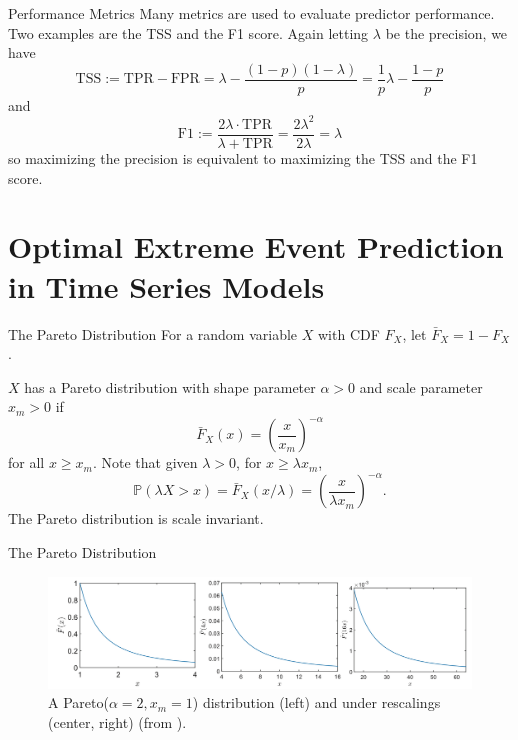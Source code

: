\documentclass{beamer}
\def\P{\mathbb P}
\begin{document}
\begin{frame}{Performance Metrics}
    Many metrics are used to evaluate predictor performance. Two examples are the TSS and the F1 score. Again letting $\lambda$ be the precision, we have
    \[
    \text{TSS} := \text{TPR} - \text{FPR} = \lambda - \frac{(1 - p)(1 - \lambda)}{p} = \frac{1}{p}\lambda - \frac{1 - p}{p}
    \]
    and
    \[
    \text{F1} := \frac{2\lambda \cdot \text{TPR}}{\lambda + \text{TPR}} = \frac{2\lambda^2}{2\lambda} = \lambda
    \]
    so maximizing the precision is equivalent to maximizing the TSS and the F1 score.
\end{frame}

\section{Optimal Extreme Event Prediction in Time Series Models}

\begin{frame}{The Pareto Distribution}
    For a random variable $X$ with CDF $F_X$, let $\bar{F}_X = 1 - F_X$.

    \smallskip
    
    $X$ has a Pareto distribution with shape parameter $\alpha > 0$ and scale parameter $x_m > 0$ if
    \[
    \bar{F}_X(x) = \left(\frac{x}{x_m}\right)^{-\alpha}
    \]
    for all $x \ge x_m$. Note that given $\lambda > 0$, for $x \ge \lambda x_m$,
    \[
    \P(\lambda X > x) = \bar{F}_X(x / \lambda) = \left(\frac{x}{\lambda x_m}\right)^{-\alpha}.
    \]
    The Pareto distribution is scale invariant.
\end{frame}

\begin{frame}{The Pareto Distribution}
    \begin{figure}[h!]
        \centering
        \includegraphics[scale=0.3]{scaled_paretos.png}
        \caption{A Pareto($\alpha = 2, x_m = 1$) distribution (left) and under rescalings (center, right) (from \cite{nair2022thef}).}
        \label{fig:scaled_paretos}
    \end{figure}
\end{frame}
\end{document}
